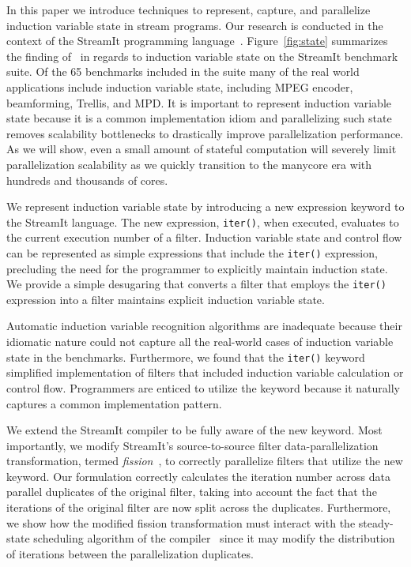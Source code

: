  
In this paper we introduce techniques to represent, capture, and
parallelize induction variable state in stream programs. Our research
is conducted in the context of the StreamIt programming
language~\cite{streamitcc}.  Figure~\ref{fig:state} summarizes the
finding of~\cite{streamit-suite} in regards to induction variable
state on the StreamIt benchmark suite.  Of the 65 benchmarks included
in the suite many of the real world applications include induction
variable state, including MPEG encoder, beamforming, Trellis, and MPD.
It is important to represent induction variable state because it is a
common implementation idiom and parallelizing such state removes
scalability bottlenecks to drastically improve parallelization
performance. As we will show, even a small amount of stateful
computation will severely limit parallelization scalability as we
quickly transition to the manycore era with hundreds and thousands of
cores.

We represent induction variable state by introducing a new expression
keyword to the StreamIt language. The new expression, {\tt iter()},
when executed, evaluates to the current execution number of a filter.
Induction variable state and control flow can be represented as simple
expressions that include the {\tt iter()} expression, precluding the
need for the programmer to explicitly maintain induction state. We
provide a simple desugaring that converts a filter that employs the
{\tt iter()} expression into a filter maintains explicit induction
variable state.

Automatic induction variable recognition algorithms are inadequate
because their idiomatic nature could not capture all the real-world
cases of induction variable state in the benchmarks.  Furthermore, we
found that the {\tt iter()} keyword simplified implementation of
filters that included induction variable calculation or control flow.
Programmers are enticed to utilize the keyword because it naturally
captures a common implementation pattern.

We extend the StreamIt compiler to be fully aware of the new keyword.
Most importantly, we modify StreamIt's source-to-source filter 
data-parallelization transformation, termed {\it
  fission}~\cite{streamit-asplos}, to correctly parallelize filters
that utilize the new keyword. Our formulation correctly calculates the
iteration number across data parallel duplicates of the original
filter, taking into account the fact that the iterations of the original
filter are now split across the duplicates. Furthermore, we show how
the modified fission transformation must interact with the
steady-state scheduling algorithm of the
compiler~\cite{karczmarek-lctes03} since it may modify the
distribution of iterations between the parallelization duplicates.

